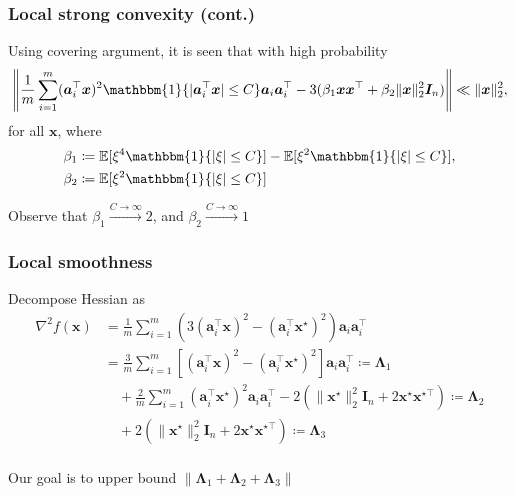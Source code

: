 \documentclass[compress,
mathserif,wide,%
]{beamer}
\newcommand{\indicator}{\ensuremath{\mathbbm{1}}}
\begin{document}
\begin{frame}
	\frametitle{Local strong convexity (cont.)}
	Using covering argument, it is seen that with high probability 
	\begin{align*}
		\left \| \frac{1}{m} \sum_{i=1}^{m} (\bm{a}_i^\top \bm{x} )^2 \indicator\{ | \bm{a}_i^\top \bm{x} | \leq C \} \bm{a}_i \bm{a}_i^\top - 3 (\beta_1 \bm{x} \bm{x}^\top + \beta_2 \|\bm{x}\|_2^2 \bm{I}_{n} ) \right \| \ll \|\bm{x}\|_{2}^2,
	\end{align*}
	for all $\bm{x}$, where 
	\begin{align*}
		\beta_1 &\coloneqq \mathbb{E} [ \xi^4 \indicator \{ | \xi | \leq C \}] - \mathbb{E} [ \xi^2 \indicator \{ | \xi | \leq C \}], \\
		\beta_2 &\coloneqq \mathbb{E} [ \xi^2 \indicator \{ | \xi | \leq C \}]
	\end{align*}
	
	Observe that $\beta_1 \stackrel{C \to \infty}{ \to } 2$, and $\beta_2 \stackrel{C \to \infty}{ \to } 1$
\end{frame}


\begin{frame}
	\frametitle{Local smoothness}
	Decompose Hessian as
		\begin{align*}
		\nabla^2 f (\bm{x}) &= \frac{1}{m} \sum_{i=1}^{m} ( 3 (\bm{a}_i^\top \bm{x} )^2 - (\bm{a}_i^\top \bm{x}^\star )^2 ) \bm{a}_i \bm{a}_i^\top \\
		&= \frac{3}{m} \sum_{i=1}^{m}   [ (\bm{a}_i^\top \bm{x} )^2 - (\bm{a}_i^\top \bm{x}^\star )^2 ] \bm{a}_i \bm{a}_i^\top \coloneqq \bm{\Lambda}_1 \\
		&\quad +\frac{2}{m} \sum_{i=1}^{m} (\bm{a}_i^\top \bm{x}^\star )^2 \bm{a}_i \bm{a}_i^\top -  2 ( \| \bm{x}^\star \|_{2}^2 \bm{I}_{n} + 2 \bm{x}^\star \bm{x}^{\star \top}  ) \coloneqq \bm{\Lambda}_2 \\
		&\quad + 2 ( \| \bm{x}^\star \|_{2}^2 \bm{I}_{n} + 2 \bm{x}^\star \bm{x}^{\star \top} )   \coloneqq \bm{\Lambda}_3 \\
		&\quad 	\end{align*}
		
Our goal is to upper bound $\| \bm{\Lambda}_1 + \bm{\Lambda}_2 + \bm{\Lambda}_3 \|$
\end{frame}
\end{document}
